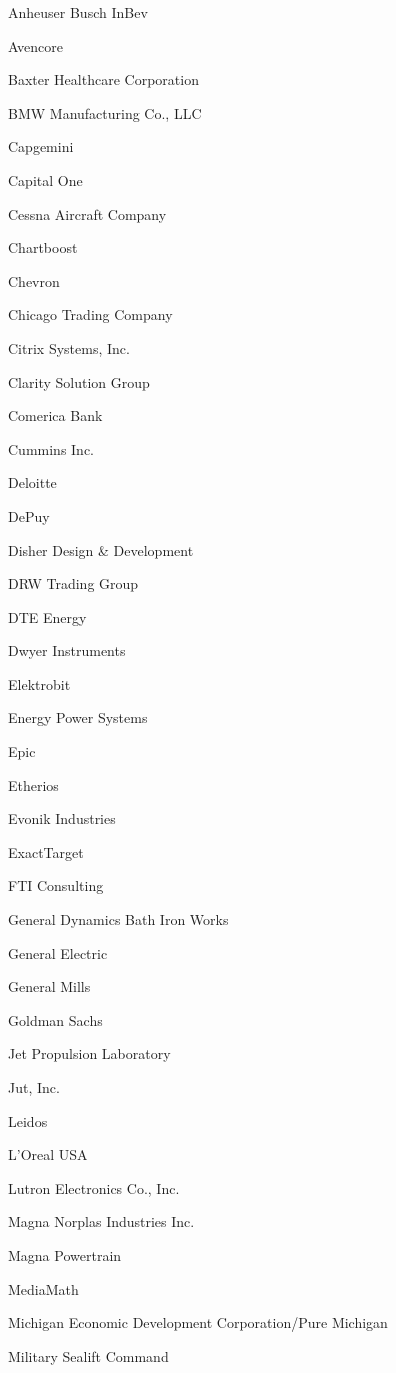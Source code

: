 \documentclass[twoside]{article}
\begin{document}
\begin{center}
\begin{multicols}{5}
\begin{FlushLeft}
\begin{compactitem}
\item Anheuser Busch InBev
\item Avencore
\item Baxter Healthcare Corporation
\item BMW Manufacturing Co., LLC
\item Capgemini
\item Capital One
\item Cessna Aircraft Company
\item Chartboost
\item Chevron
\item Chicago Trading Company
\item Citrix Systems, Inc.
\item Clarity Solution Group
\item Comerica Bank
\item Cummins Inc.
\item Deloitte
\item DePuy
\item Disher Design \& Development
\item DRW Trading Group
\item DTE Energy
\item Dwyer Instruments
\item Elektrobit
\item Energy Power Systems
\item Epic
\item Etherios
\item Evonik Industries
\item ExactTarget
\item FTI Consulting
\item General Dynamics Bath Iron Works
\item General Electric
\item General Mills
\item Goldman Sachs
\item Jet Propulsion Laboratory
\item Jut, Inc.
\item Leidos
\item L'Oreal USA
\item Lutron Electronics Co., Inc.
\item Magna Norplas Industries Inc.
\item Magna Powertrain
\item MediaMath
\item Michigan Economic Development Corporation/Pure Michigan
\item Military Sealift Command

\end{compactitem}
\end{FlushLeft}
\end{multicols}
\end{center}
\end{document}
